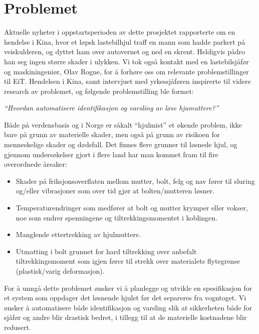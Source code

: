 \section{Problemet}

Aktuelle nyheter i oppstartsperioden av dette prosjektet rapporterte om en 
hendelse i Kina, hvor et løpsk lastebilhjul traff en mann som hadde parkert på 
veiskulderen, og dyttet ham over autovernet og ned en skrent. Heldigvis pådro 
han seg ingen større skader i ulykken. Vi tok også kontakt med en lastebilsjåfør
 og maskiningeniør, Olav Rogne, for å forhøre oss om relevante problemstillinger 
til EiT. Hendelsen i Kina, samt intervjuet med yrkessjåføren inspirerte til videre
research av problemet, og følgende problemstilling ble formet:

\begin{center}
\emph{``Hvordan automatisere identifikasjon og varsling av løse hjumuttere?''}
\end{center}

Både på verdensbasis og i Norge er såkalt ``hjulmist'' \cite{hjulmist} et økende problem, ikke bare 
på grunn av materielle skader, men også på grunn av risikoen for menneskelige 
skader og dødsfall. Det finnes flere grunner til løsnede hjul, og gjennom undersøkelser 
gjort i flere land \cite{hjulmist} har man kommet fram til fire overordnede årsaker:

\begin{itemize}
\item{ Skader på friksjonsoverflaten mellom mutter, bolt, felg og nav fører til sluring og/eller
vibrasjoner som over tid gjør at bolten/mutteren løsner.}
\item { Temperaturendringer som medfører at bolt og mutter krymper eller vokser, noe som 
endrer spenningene og tiltrekkingsmomentet i koblingen.}
\item{ Manglende ettertrekking av hjulmuttere.}
\item{ Utmatting i bolt grunnet for hard tiltrekking over anbefalt tiltrekkingsmoment som igjen 
fører til strekk over materialets flytegrense (plastisk/varig deformasjon).}
\end{itemize}

For å unngå dette problemet ønsker vi å planlegge og utvikle en spesifikasjon for et system som oppdager 
det løsnende hjulet før det separeres fra vogntoget. Vi ønsker å automatisere både identifikasjon
og varsling slik at sikkerheten både for sjåfør og andre blir drastisk bedret, i tillegg til at de materielle
kostnadene blir redusert.
